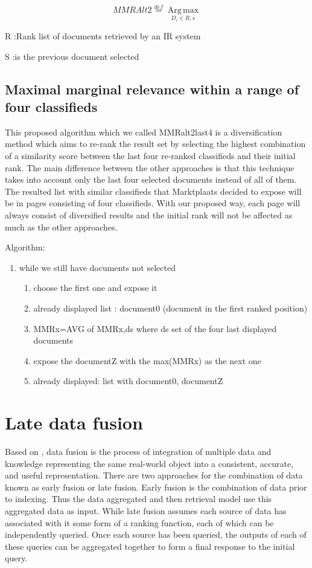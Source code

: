 \begin{equation}
MMRAlt2\overset{def}{=}\operatorname*{Arg \, \max}_{D_{i}\in R,s}
\end{equation}


R :Rank list of documents retrieved by an IR system

S :is the previous document selected


\subsection{Maximal marginal relevance within a range of four classifieds}

This proposed algorithm which we called MMRalt2last4 is a diversification method which aims to re-rank the result set by selecting the highest combination of a similarity score between the last four re-ranked classifieds and their initial rank. The main difference between the other approaches is that this technique takes into account only the last four selected documents instead of all of them. The resulted list with similar classifieds that Marktplaats decided to expose will be in pages consisting of four classifieds. With our proposed way, each page will always consist of diversified results and the initial rank will not be affected as much as the other approaches. 

Algorithm:
\begin{enumerate}
\item while we still have documents not selected
	\begin{enumerate}
	\item choose the first one and expose it
	\item already displayed list : document0 (document in the first ranked position)
	\item MMRx=AVG of MMRx,ds where ds set of the four last displayed documents
	\item expose the documentZ with the max(MMRx) as the next one
	\item already displayed: list with document0, documentZ
	\end{enumerate}
\end{enumerate}


\section{Late data fusion}

Based on \cite{Wilkins}, data fusion is the process of integration of multiple data and knowledge representing the same real-world object into a consistent, accurate, and useful representation. There are two approaches for the combination of data known as early fusion or late fusion. Early fusion is the combination of data prior to indexing. Thus the data aggregated and then retrieval model use this aggregated data as input. While late fusion assumes each source of data has associated with it some form of a ranking function, each of which can be independently queried. Once each source has been queried, the outputs of each of these queries can be aggregated together to form a final response to the initial query.

